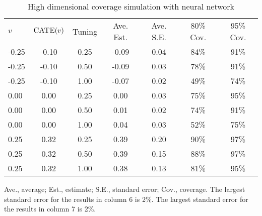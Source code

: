 \begin{table}[H]
\centering
  \begin{threeparttable}
    \caption{High dimensional coverage simulation with neural network}
     \begin{tabular}{lcccccc}
       $v$& $\textsc{CATE}(v)$ & Tuning &  Ave. Est. & Ave. S.E. &  80\% Cov. & 95\% Cov. \\[5pt]
-0.25 & -0.10 & 0.25 & -0.09 & 0.04 &  84\% & 91\% \\
-0.25 & -0.10 & 0.50 & -0.09 & 0.03  & 78\% & 91\% \\
-0.25 & -0.10 & 1.00 & -0.07 & 0.02  & 49\% & 74\% \\
0.00 & 0.00 & 0.25 & 0.00 & 0.03 &  75\% & 95\% \\
0.00 & 0.00 & 0.50 & 0.01 & 0.02  & 74\% & 91\% \\
0.00 & 0.00 & 1.00 & 0.04 & 0.03  & 52\% & 75\% \\
0.25 & 0.32 & 0.25 & 0.39 & 0.20 &  90\% & 97\% \\
0.25 & 0.32 & 0.50 & 0.39 & 0.15  & 88\% & 97\% \\
0.25 & 0.32 & 1.00 & 0.38 & 0.13  & 81\% & 95\% 
     \end{tabular}
     \label{tab:nn_high}
    \begin{tablenotes}
      \small
      \item Ave., average; Est., estimate; S.E., standard error; Cov., coverage. The largest standard error for the results in column 6 is 2\%. The largest standard error for the results in column 7 is 2\%.
    \end{tablenotes}
  \end{threeparttable}
\end{table}



